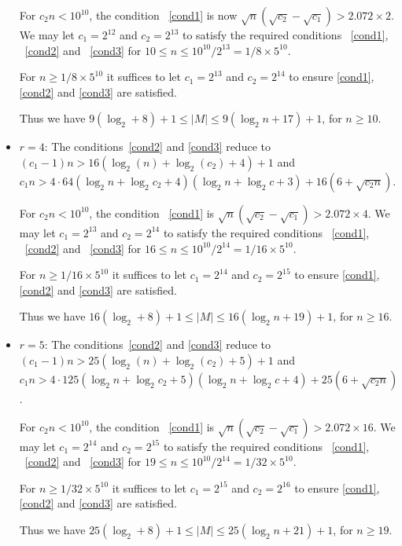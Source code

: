 \documentclass[12pt]{article} \pagestyle{plain} \topmargin
\begin{document}
\begin{itemize}
For $c_2n < 10^{10}$, the condition ~\eqref{cond1} is now
$\sqrt{n}(\sqrt{c_2}-\sqrt{c_1})> 2.072\times2$. We may let
$c_1=2^{12}$ and $c_2=2^{13}$ to satisfy the required conditions
~\eqref{cond1}, ~\eqref{cond2} and ~\eqref{cond3} for $10 \leq n\leq
10^{10}/2^{13}=1/8\times 5^{10}$.

For $n \geq 1/8\times 5^{10}$ it suffices to let $c_1=2^{13}$ and
$c_2=2^{14}$ to ensure \eqref{cond1}, \eqref{cond2} and
\eqref{cond3} are satisfied.

Thus we have $9(\log_2 +8)+1 \leq |M| \leq 9(\log_2n+17)+1$, for
$n\geq 10$.

\item $r=4$: The conditions~\eqref{cond2} and \eqref{cond3} reduce
 to $(c_1-1)n >16(
\log_2(n)+\log_2(c_2)+4)+1$ and $c_1n > 4\cdot64(\log_2 n+ \log_2
c_2+4)(\log_2n+\log_2 c+3)+16(6+\sqrt{c_2n})$.

For $c_2n < 10^{10}$, the condition ~\eqref{cond1} is
$\sqrt{n}(\sqrt{c_2}-\sqrt{c_1})> 2.072\times4$. We may let
$c_1=2^{13}$ and $c_2=2^{14}$ to satisfy the required conditions
~\eqref{cond1}, ~\eqref{cond2} and ~\eqref{cond3} for $16 \leq n\leq
10^{10}/2^{14}=1/{16}\times 5^{10}$.

For $n \geq 1/16\times 5^{10}$ it suffices to let $c_1=2^{14}$ and
$c_2=2^{15}$ to ensure \eqref{cond1}, \eqref{cond2} and
\eqref{cond3} are satisfied.

Thus we have $16(\log_2 +8)+1 \leq |M| \leq 16(\log_2n+19)+1$, for
$n\geq 16$.

\item $r=5$: The conditions~\eqref{cond2} and \eqref{cond3} reduce
 to $(c_1-1)n >25(
\log_2(n)+\log_2(c_2)+5)+1$ and $c_1n > 4\cdot125(\log_2 n+ \log_2
c_2+5)(\log_2n+\log_2 c+4)+25(6+\sqrt{c_2n})$.

For $c_2n < 10^{10}$, the condition ~\eqref{cond1} is
$\sqrt{n}(\sqrt{c_2}-\sqrt{c_1})> 2.072\times 16$. We may let
$c_1=2^{14}$ and $c_2=2^{15}$ to satisfy the required conditions
~\eqref{cond1}, ~\eqref{cond2} and ~\eqref{cond3} for $19 \leq n\leq
10^{10}/2^{14}=1/{32}\times 5^{10}$.

For $n \geq 1/32\times 5^{10}$ it suffices to let $c_1=2^{15}$ and
$c_2=2^{16}$ to ensure \eqref{cond1}, \eqref{cond2} and
\eqref{cond3} are satisfied.

Thus we have $25(\log_2 +8)+1 \leq |M| \leq 25(\log_2n+21)+1$, for
$n\geq 19$.


\end{itemize}
\end{document}
